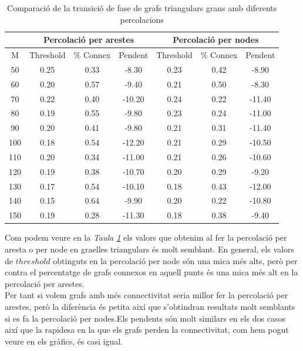 \documentclass[a4paper]{article}
\begin{document}
	\begin{table}[H]
		\centering
		\begin{tabular}{|c|c|c|c|c|c|c|}
			\hline
			\rowcolor{gray!30}
			\multicolumn{1}{|c|}{} &\multicolumn{3}{|c|}{Percolació per arestes} & \multicolumn{3}{|c|}{Percolació per nodes} \\ \hline
			\rowcolor{gray!30}
			M & Threshold & \% Connex & Pendent & Threshold & \% Connex & Pendent \\ \hline
			50 & 0.25 & 0.33 & -8.30 & 0.23 & 0.42 & -8.90	\\ \hline
			60 & 0.20 & 0.57 & -9.40 & 0.21 & 0.50 & -8.30	\\ \hline
			70 & 0.22 & 0.40 & -10.20 & 0.24 & 0.22 & -11.40	\\ \hline
			80 & 0.19 & 0.55 & -9.80 & 0.23 & 0.24 & -11.00	\\ \hline
			90 & 0.20 & 0.41 & -9.80 & 0.21 & 0.31 & -11.40	\\ \hline
			100 & 0.18 & 0.54 & -12.20 & 0.21 & 0.29 & -10.50	\\ \hline
			110 & 0.20 & 0.34 & -11.00 & 0.21 & 0.26 & -10.60	\\ \hline
			120 & 0.19 & 0.38 & -10.70 & 0.20 & 0.29 & -9.20	\\ \hline
			130 & 0.17 & 0.54 & -10.10 & 0.18 & 0.43 & -12.00	\\ \hline
			140 & 0.15 & 0.64 & -9.90  & 0.20 & 0.22 & -10.80	\\ \hline
			150 & 0.19 & 0.28 & -11.30 & 0.18 & 0.38 & -9.40	\\ \hline
		\end{tabular}
		\caption{Comparació de la transició de fase de grafs triangulars grans amb diferents percolacions}
		\label{tab:comparacio_edges_nodes_triangulars}
	\end{table}
	
	Com podem veure en la \textit{Taula \ref{tab:comparacio_edges_nodes_triangulars}} els valors que obtenim al fer la percolació per aresta o per node en graelles triangulars és molt semblant. En general, els valors de $threshold$ obtinguts en la percolació per node són una mica més alts, però per contra el percentatge de grafs connexos en aquell punts és una mica més alt en la percolació per arestes. \\
	
	Per tant si volem grafs amb més connectivitat seria millor fer la percolació per arestes, però la diferència és petita així que s'obtindran resultats molt semblants si es fa la percolació per nodes.Els pendents són molt similars en els dos casos així que la rapidesa en la que els grafs perden la connectivitat, com hem pogut veure en els gràfics, és casi igual.
	
\end{document}
